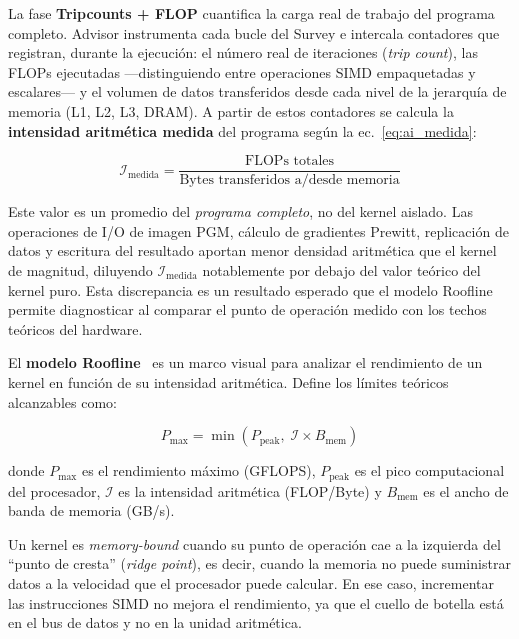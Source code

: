 La fase \textbf{Tripcounts + FLOP} cuantifica la carga real de
trabajo del programa completo.
Advisor instrumenta cada bucle del Survey e intercala contadores
que registran, durante la ejecuci\'on: el n\'umero real de
iteraciones (\textit{trip count}), las FLOPs ejecutadas
---distinguiendo entre operaciones SIMD empaquetadas y escalares---
y el volumen de datos transferidos desde cada nivel de la jerarqu\'ia
de memoria (L1, L2, L3, DRAM).
A partir de estos contadores se calcula la \textbf{intensidad
aritm\'etica medida} del programa seg\'un la ec.~\ref{eq:ai_medida}:

\begin{equation}
  \mathcal{I}_{\text{medida}} =
  \frac{\text{FLOPs totales}}{\text{Bytes transferidos a/desde memoria}}
  \label{eq:ai_medida}
\end{equation}

Este valor es un promedio del \emph{programa completo}, no del
kernel aislado.
Las operaciones de I/O de imagen PGM, c\'alculo de gradientes
Prewitt, replicaci\'on de datos y escritura del resultado
aportan menor densidad aritm\'etica que el kernel de magnitud,
diluyendo $\mathcal{I}_{\text{medida}}$ notablemente por debajo
del valor te\'orico del kernel puro.
Esta discrepancia es un resultado esperado que el modelo Roofline
permite diagnosticar al comparar el punto de operaci\'on medido
con los techos te\'oricos del hardware.

El \textbf{modelo Roofline}~\cite{williams2009} es un marco
visual para analizar el rendimiento de un kernel en funci\'on
de su intensidad aritm\'etica.
Define los l\'imites te\'oricos alcanzables como:

\begin{equation}
  P_{\max} = \min\!\left(P_{\text{peak}},\;
             \mathcal{I} \times B_{\text{mem}}\right)
  \label{eq:roofline}
\end{equation}

donde $P_{\max}$ es el rendimiento m\'aximo (GFLOPS),
$P_{\text{peak}}$ es el pico computacional del procesador,
$\mathcal{I}$ es la intensidad aritm\'etica (FLOP/Byte) y
$B_{\text{mem}}$ es el ancho de banda de memoria (GB/s).

Un kernel es \textit{memory-bound} cuando su punto de operaci\'on
cae a la izquierda del ``punto de cresta'' (\textit{ridge point}),
es decir, cuando la memoria no puede suministrar datos a la
velocidad que el procesador puede calcular.
En ese caso, incrementar las instrucciones SIMD no mejora el
rendimiento, ya que el cuello de botella est\'a en el bus de
datos y no en la unidad aritm\'etica.
